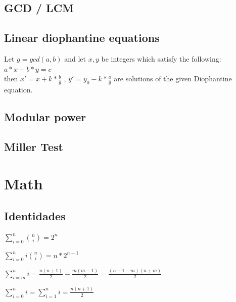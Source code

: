 \subsection{GCD / LCM}
\subsection{Linear diophantine equations}
Let $g=gcd(a,b)$ and let $x, y$ be integers which satisfy the following: $a*x+b*y=c$\\
then $x'=x+k*\frac{b}{g}$ , $y'=y_0-k*\frac{a}{g}$
are solutions of the given Diophantine equation.
\subsection{Modular power}
\subsection{Miller Test}


\section{Math}%
\subsection{Identidades}

$\sum_{i=0}^n\binom{n}{i}=2^n$

$\sum_{i=0}^n i\binom{n}{i}=n*2^{n-1}$

$\sum_{i=m}^n i = \frac{n(n+1)}{2} - \frac{m(m-1)}{2} = \frac{(n+1-m)(n+m)}{2}$

$\sum_{i=0}^n i = \sum_{i=1}^n i = \frac{n(n+1)}{2}$

